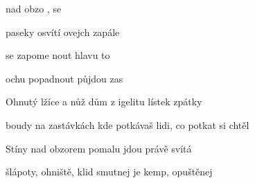 

\zs
{} nad obzo ,
 se 

paseky osvítí ovejch  zapále
\ks

\zr
{} se zapome
nout hlavu to 

ochu popadnout  půjdou zas 
\kr

\zs
Ohnutý lžíce a nůž dům z igelitu lístek zpátky

boudy na zastávkách kde potkávaš lidi,
co potkat si chtěl
\ks

\zr \kr

\zs
Stíny nad obzorem pomalu jdou právě svítá

šlápoty, ohniště, klid smutnej
je kemp, opuštěnej
\ks

\zr \kr

\kp





